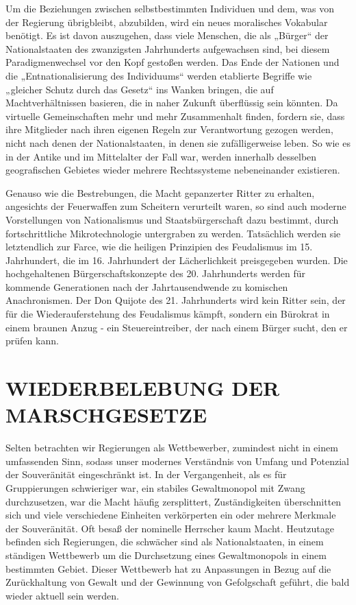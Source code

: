 \documentclass[
  a5paper,
  smalldemyvopaper,10pt,twoside,onecolumn,openright,extrafontsizes,hidelinks]{memoir}
\begin{document}
Um die Beziehungen zwischen selbstbestimmten Individuen und dem, was von
der Regierung übrigbleibt, abzubilden, wird ein neues moralisches
Vokabular benötigt. Es ist davon auszugehen, dass viele Menschen, die
als „Bürger`` der Nationalstaaten des zwanzigsten Jahrhunderts
aufgewachsen sind, bei diesem Paradigmenwechsel vor den Kopf gestoßen
werden. Das Ende der Nationen und die „Entnationalisierung des
Individuums`` werden etablierte Begriffe wie „gleicher Schutz durch das
Gesetz`` ins Wanken bringen, die auf Machtverhältnissen basieren, die in
naher Zukunft überflüssig sein könnten. Da virtuelle Gemeinschaften mehr
und mehr Zusammenhalt finden, fordern sie, dass ihre Mitglieder nach
ihren eigenen Regeln zur Verantwortung gezogen werden, nicht nach denen
der Nationalstaaten, in denen sie zufälligerweise leben. So wie es in
der Antike und im Mittelalter der Fall war, werden innerhalb desselben
geografischen Gebietes wieder mehrere Rechtssysteme nebeneinander
existieren.

Genauso wie die Bestrebungen, die Macht gepanzerter Ritter zu erhalten,
angesichts der Feuerwaffen zum Scheitern verurteilt waren, so sind auch
moderne Vorstellungen von Nationalismus und Staatsbürgerschaft dazu
bestimmt, durch fortschrittliche Mikrotechnologie untergraben zu werden.
Tatsächlich werden sie letztendlich zur Farce, wie die heiligen
Prinzipien des Feudalismus im 15. Jahrhundert, die im 16. Jahrhundert
der Lächerlichkeit preisgegeben wurden. Die hochgehaltenen
Bürgerschaftskonzepte des 20. Jahrhunderts werden für kommende
Generationen nach der Jahrtausendwende zu komischen Anachronismen. Der
Don Quijote des 21. Jahrhunderts wird kein Ritter sein, der für die
Wiederauferstehung des Feudalismus kämpft, sondern ein Bürokrat in einem
braunen Anzug - ein Steuereintreiber, der nach einem Bürger sucht, den
er prüfen kann.

\section{WIEDERBELEBUNG DER
MARSCHGESETZE}\label{wiederbelebung-der-marschgesetze}

Selten betrachten wir Regierungen als Wettbewerber, zumindest nicht in
einem umfassenden Sinn, sodass unser modernes Verständnis von Umfang und
Potenzial der Souveränität eingeschränkt ist. In der Vergangenheit, als
es für Gruppierungen schwieriger war, ein stabiles Gewaltmonopol mit
Zwang durchzusetzen, war die Macht häufig zersplittert, Zuständigkeiten
überschnitten sich und viele verschiedene Einheiten verkörperten ein
oder mehrere Merkmale der Souveränität. Oft besaß der nominelle
Herrscher kaum Macht. Heutzutage befinden sich Regierungen, die
schwächer sind als Nationalstaaten, in einem ständigen Wettbewerb um die
Durchsetzung eines Gewaltmonopols in einem bestimmten Gebiet. Dieser
Wettbewerb hat zu Anpassungen in Bezug auf die Zurückhaltung von Gewalt
und der Gewinnung von Gefolgschaft geführt, die bald wieder aktuell sein
werden.
\end{document}
